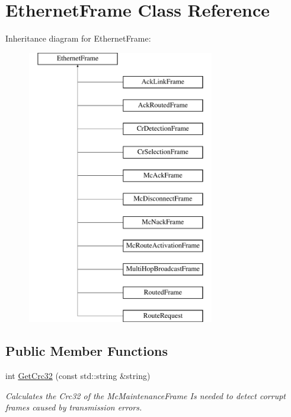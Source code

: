 \hypertarget{classEthernetFrame}{\section{Ethernet\-Frame Class Reference}
\label{classEthernetFrame}
}
Inheritance diagram for Ethernet\-Frame\-:\begin{figure}[H]
\begin{center}
\leavevmode
\includegraphics[height=12.000000cm]{classEthernetFrame}
\end{center}
\end{figure}
\subsection*{Public Member Functions}
\begin{DoxyCompactItemize}
\item 
int \hyperlink{classEthernetFrame_a2645ddba8bd1082d6386d77b124da9d3}{Get\-Crc32} (const std\-::string \&string)
\begin{DoxyCompactList}\small\item\em Calculates the Crc32 of the Mc\-Maintenance\-Frame Is needed to detect corrupt frames caused by transmission errors. \end{DoxyCompactList}\end{DoxyCompactItemize}
